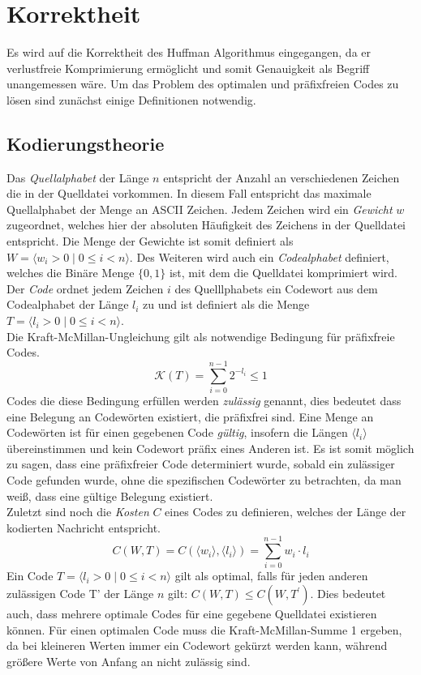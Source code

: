 \documentclass[course=erap]{aspdoc}
\begin{document}
\section{Korrektheit}
Es wird auf die Korrektheit des Huffman Algorithmus eingegangen, da er verlustfreie Komprimierung ermöglicht und somit Genauigkeit als Begriff unangemessen wäre.
Um das Problem des optimalen und präfixfreien Codes zu lösen sind zunächst einige Definitionen notwendig.

\subsection{Kodierungstheorie}

Das \textit{Quellalphabet} der Länge $n$ entspricht der Anzahl an verschiedenen Zeichen die in der Quelldatei vorkommen. In diesem Fall entspricht das maximale Quellalphabet der Menge an ASCII Zeichen.
Jedem Zeichen wird ein \textit{Gewicht} $w$ zugeordnet, welches hier der absoluten Häufigkeit des Zeichens in der Quelldatei entspricht. Die Menge der Gewichte ist somit definiert als $W = \langle w_i > 0 \mid 0 \le i < n \rangle $.
Des Weiteren wird auch ein \textit{Codealphabet} definiert, welches die Binäre Menge $\lbrace0, 1\rbrace$ ist, mit dem die Quelldatei komprimiert wird.
Der \textit{Code} ordnet jedem Zeichen $i$ des Quelllphabets ein Codewort aus dem Codealphabet der Länge $l_i$ zu und ist definiert als die Menge $T = \langle l_i > 0 \mid 0 \le i < n \rangle$.\\
Die Kraft-McMillan-Ungleichung gilt als notwendige Bedingung für präfixfreie Codes.
$$\mathcal{K}(T) = \sum_{i=0}^{n-1} 2^{-l_i} \le 1$$
Codes die diese Bedingung erfüllen werden \textit{zulässig} genannt, dies bedeutet dass eine Belegung an Codewörten existiert, die präfixfrei sind.
Eine Menge an Codewörten ist für einen gegebenen Code \textit{gültig}, insofern die Längen $\langle l_i \rangle$ übereinstimmen und kein Codewort präfix eines Anderen ist.
Es ist somit möglich zu sagen, dass eine präfixfreier Code determiniert wurde, sobald ein zulässiger Code gefunden wurde, ohne die spezifischen Codewörter zu betrachten, da man weiß, dass eine gültige Belegung existiert.\\
Zuletzt sind noch die \textit{Kosten} $C$ eines Codes zu definieren, welches der Länge der kodierten Nachricht entspricht.
$$C(W,T) = C(\langle w_i \rangle,\langle l_i \rangle) = \sum_{i=0}^{n-1} w_i \cdot l_i $$
Ein Code $T = \langle l_i > 0 \mid 0 \le i < n \rangle$ gilt als optimal, falls für jeden anderen zulässigen Code T' der Länge $n$ gilt: $C(W,T) \le C(W,T^{\prime})$. Dies bedeutet auch, dass mehrere optimale Codes für eine gegebene Quelldatei existieren können.
Für einen optimalen Code muss die Kraft-McMillan-Summe 1 ergeben, da bei kleineren Werten immer ein Codewort gekürzt werden kann, während größere Werte von Anfang an nicht zulässig sind.
\end{document}
